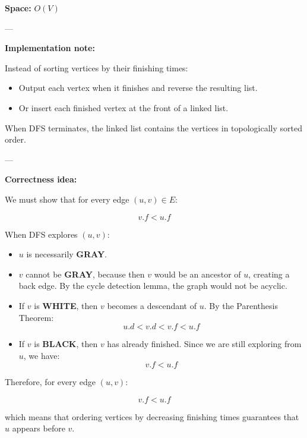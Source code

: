 \documentclass[11pt,a4paper,openany]{book}
\begin{document}
\textbf{Space:} $O(V)$


---


\textbf{Implementation note:}

Instead of sorting vertices by their finishing times:

\begin{itemize}
    \item Output each vertex when it finishes and reverse the resulting list.
    \item Or insert each finished vertex at the front of a linked list.
\end{itemize}

When DFS terminates, the linked list contains the vertices in topologically sorted order.

---

\textbf{Correctness idea:}

We must show that for every edge $(u,v) \in E$:

\[
v.f < u.f
\]

When DFS explores $(u,v)$:

\begin{itemize}
    \item $u$ is necessarily \textbf{GRAY}.
    
    \item $v$ cannot be \textbf{GRAY}, because then $v$ would be an ancestor of $u$, creating a back edge. By the cycle detection lemma, the graph would not be acyclic.
    
    \item If $v$ is \textbf{WHITE}, then $v$ becomes a descendant of $u$. By the Parenthesis Theorem:
    \[
    u.d < v.d < v.f < u.f
    \]
    
    \item If $v$ is \textbf{BLACK}, then $v$ has already finished. Since we are still exploring from $u$, we have:
    \[
    v.f < u.f
    \]
\end{itemize}

Therefore, for every edge $(u,v)$:

\[
v.f < u.f
\]

which means that ordering vertices by decreasing finishing times guarantees that $u$ appears before $v$.









\vspace{2cm}
\end{document}
